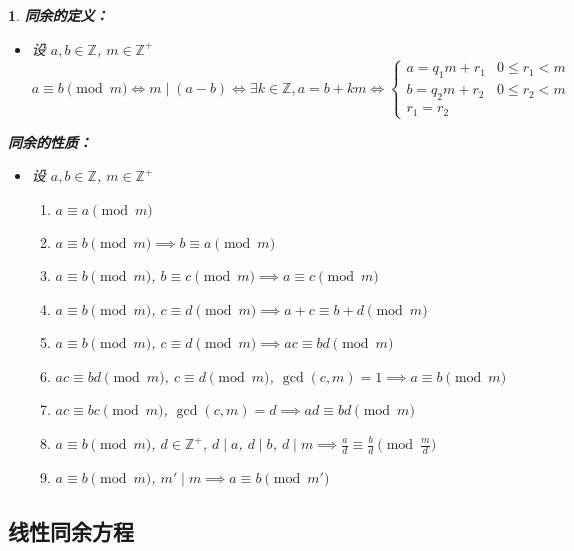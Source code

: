 \documentclass[UTF8]{report}
\theoremstyle{MyLineTheoremStyle} %
\theoremstyle{MyBlockTheoremStyle} %
\theoremstyle{MySubsubsectionStyle} %
\newtheorem{definition}{}
\begin{document}
\begin{definition}
    \textbf{同余的定义：}
    \begin{itemize}
        \item 设 $a, b \in \mathbb{Z}$, $m \in \mathbb{Z}^+$
        \[
        a \equiv b \pmod{m} \iff m \mid (a - b) \iff \exists k \in \mathbb{Z}, a = b + km \iff 
        \begin{cases}
            a = q_1m + r_1 & 0 \leq r_1 < m \\
            b = q_2m + r_2 & 0 \leq r_2 < m \\
            r_1 = r_2
        \end{cases}
        \]
    \end{itemize}

    \textbf{同余的性质：}
    \begin{itemize}
        \item 设 $a, b \in \mathbb{Z}$, $m \in \mathbb{Z}^+$
        \begin{enumerate}
            \item $a \equiv a \pmod{m}$
            \item $a \equiv b \pmod{m} \implies b \equiv a \pmod{m}$
            \item $a \equiv b \pmod{m}$, $b \equiv c \pmod{m} \implies a \equiv c \pmod{m}$
            \item $a \equiv b \pmod{m}$, $c \equiv d \pmod{m} \implies a + c \equiv b + d \pmod{m}$
            \item $a \equiv b \pmod{m}$, $c \equiv d \pmod{m} \implies ac \equiv bd \pmod{m}$
            \item $ac \equiv bd \pmod{m}$, $c \equiv d \pmod{m}$, $\gcd(c, m) = 1 \implies a \equiv b \pmod{m}$
            \item $ac \equiv bc \pmod{m}$, $\gcd(c, m) = d \implies ad \equiv bd \pmod{m}$
            \item $a \equiv b \pmod{m}$, $d \in \mathbb{Z}^+$, $d \mid a$, $d \mid b$, $d \mid m \implies \frac{a}{d} \equiv \frac{b}{d} \pmod{\frac{m}{d}}$
            \item $a \equiv b \pmod{m}$, $m' \mid m \implies a \equiv b \pmod{m'}$
        \end{enumerate}
    \end{itemize}
\end{definition}

\subsection{线性同余方程}
\end{document}
